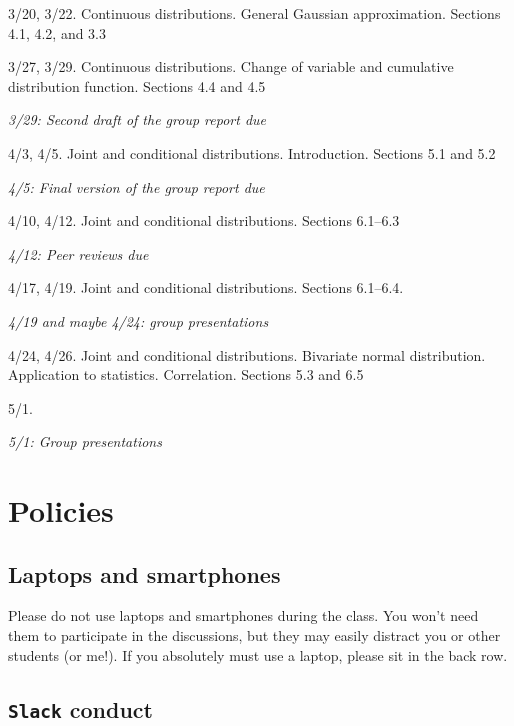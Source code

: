 \documentclass[oneside,11pt]{amsart}
\begin{document}
\begin{enumerate}[\bf{}{[}week 1{]}]
	\item 3/20, 3/22. Continuous distributions. General Gaussian approximation. Sections 4.1, 4.2, and 3.3

	\item 3/27, 3/29. Continuous distributions. Change of variable and cumulative distribution function. Sections 4.4 and 4.5

		\emph{3/29: Second draft of the group report due}

	\item 4/3, 4/5. Joint and conditional distributions. Introduction. Sections 5.1 and 5.2
	
		\emph{4/5: Final version of the group report due}

	\item 4/10, 4/12. Joint and conditional distributions. 
		Sections 6.1--6.3

		\emph{4/12: Peer reviews due}
	
	\item 4/17, 4/19. Joint and conditional distributions. Sections 6.1--6.4.
		
		\emph{4/19 and maybe 4/24: group presentations}
	
	\item 4/24, 4/26. Joint and conditional distributions. Bivariate normal distribution. 
		Application to statistics. Correlation. Sections 5.3 and 6.5
	
	\item 5/1.

		\emph{5/1: Group presentations}
\end{enumerate}

\section{Policies}

\subsection{Laptops and smartphones}

Please do not use laptops and smartphones during the class.
You won't need them to participate in the discussions, but they may easily distract 
you or other students (or me!). If you absolutely must use a laptop, please sit in the back row.

\subsection{\texttt{Slack} conduct}
\end{document}
